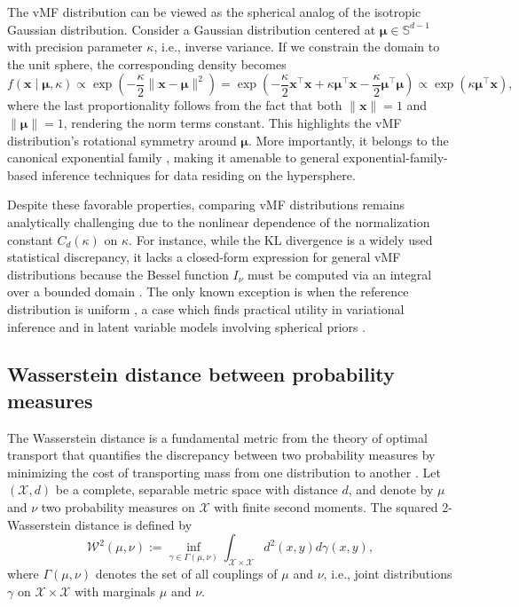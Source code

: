 \documentclass[10pt]{article}
\newcommand{\bfx}{\boldsymbol{x}}
\newcommand{\bfmu}{\boldsymbol{\mu}}
\newcommand{\bbS}{\mathbb{S}}
\begin{document}
The vMF distribution can be viewed as the spherical analog of the isotropic Gaussian distribution. Consider a Gaussian distribution centered at $\bfmu \in \bbS^{d-1}$ with precision parameter $\kappa$, i.e., inverse variance.  If we constrain the domain to the unit sphere, the corresponding density becomes \begin{equation*} f(\bfx \mid \bfmu, \kappa) \propto \exp \left( -\frac{\kappa}{2}\|\bfx - \bfmu\|^2 \right) = \exp \left( -\frac{\kappa}{2} \bfx^\top \bfx + \kappa \bfmu^\top \bfx - \frac{\kappa}{2} \bfmu^\top \bfmu \right) \propto \exp \left( \kappa \bfmu^\top \bfx \right), \end{equation*} where the last proportionality follows from the fact that both $\|\bfx\| = 1$ and $\|\bfmu\| = 1$, rendering the norm terms constant. This highlights the vMF distribution's rotational symmetry around $\bfmu$. More importantly, it belongs to the canonical exponential family \citep{pitman_1937_SignificanceTestsWhich, koopman_1936_DistributionsAdmittingSufficient}, making it amenable to general exponential-family-based inference techniques for data residing on the hypersphere.


Despite these favorable properties, comparing vMF distributions remains analytically challenging due to the nonlinear dependence of the normalization constant $C_d(\kappa)$ on $\kappa$. For instance, while the KL divergence is a widely used statistical discrepancy, it lacks a closed-form expression for general vMF distributions because the Bessel function $I_\nu$ must be computed via an integral over a bounded domain \citep{abramowitz_1972_HandbookMathematicalFunctions}. The only known exception is when the reference distribution is uniform \citep{diethe_2015_NoteKullbackLeiblerDivergence}, a case which finds practical utility in variational inference \citep{gopal_2014_MisesfisherClusteringModels} and in latent variable models involving spherical priors \citep{xu_2018_SphericalLatentSpaces, davidson_2022_HypersphericalVariationalAutoEncoders}.



\subsection{Wasserstein distance between probability measures}
The Wasserstein distance is a fundamental metric from the theory of optimal transport that quantifies the discrepancy between two probability measures by minimizing the cost of transporting mass from one distribution to another \citep{villani_2003_TopicsOptimalTransportation, villani_2009_OptimalTransportOld}. Let $(\mathcal{X}, d)$ be a complete, separable metric space with distance $d$, and denote by $\mu$ and $\nu$  two probability measures on $\mathcal{X}$ with finite second moments. The squared 2-Wasserstein distance is defined by \begin{equation}\label{eq-wasserstein-definition} \mathcal{W}^2(\mu, \nu) := \inf_{\gamma \in \Gamma(\mu, \nu)} \int_{\mathcal{X} \times \mathcal{X}} d^2(x, y)  d\gamma(x, y), \end{equation} where $\Gamma(\mu, \nu)$ denotes the set of all couplings of $\mu$ and $\nu$, i.e., joint distributions $\gamma$ on $\mathcal{X} \times \mathcal{X}$ with marginals $\mu$ and $\nu$.
\end{document}
